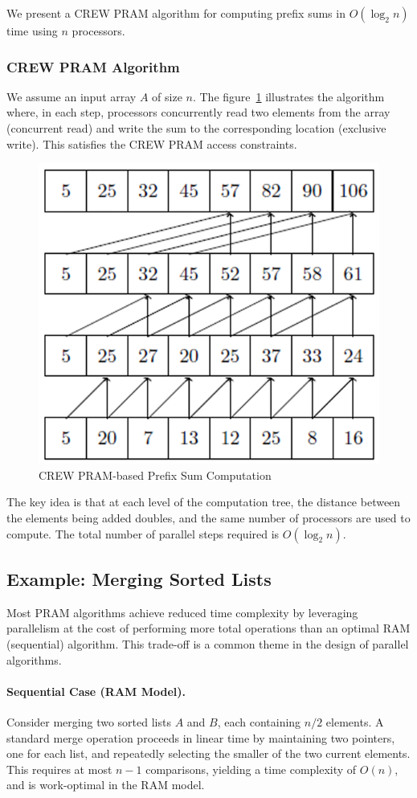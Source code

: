 \documentclass[12pt]{book}
\begin{document}
We present a CREW PRAM algorithm for computing prefix sums in $O(\log_2 n)$ time using $n$ processors.

\subsubsection{CREW PRAM Algorithm}
We assume an input array $A$ of size $n$. The figure~\ref{fig:CREW_prefix} illustrates the algorithm where, in each step, processors concurrently read two elements from the array (concurrent read) and write the sum to the corresponding location (exclusive write). This satisfies the CREW PRAM access constraints.

\begin{figure}[H]
    \centering
    \includegraphics[width=0.6\linewidth]{images/CREW_prefix.png}
    \caption{CREW PRAM-based Prefix Sum Computation}
    \label{fig:CREW_prefix}
\end{figure}

The key idea is that at each level of the computation tree, the distance between the elements being added doubles, and the same number of processors are used to compute. The total number of parallel steps required is $O(\log_2 n)$.

\subsection{Example: Merging Sorted Lists}

Most PRAM algorithms achieve reduced time complexity by leveraging parallelism at the cost of performing more total operations than an optimal RAM (sequential) algorithm. This trade-off is a common theme in the design of parallel algorithms.

\paragraph{Sequential Case (RAM Model).}  
Consider merging two sorted lists $A$ and $B$, each containing $n/2$ elements. A standard merge operation proceeds in linear time by maintaining two pointers, one for each list, and repeatedly selecting the smaller of the two current elements. This requires at most $n - 1$ comparisons, yielding a time complexity of $O(n)$, and is work-optimal in the RAM model.
\end{document}
